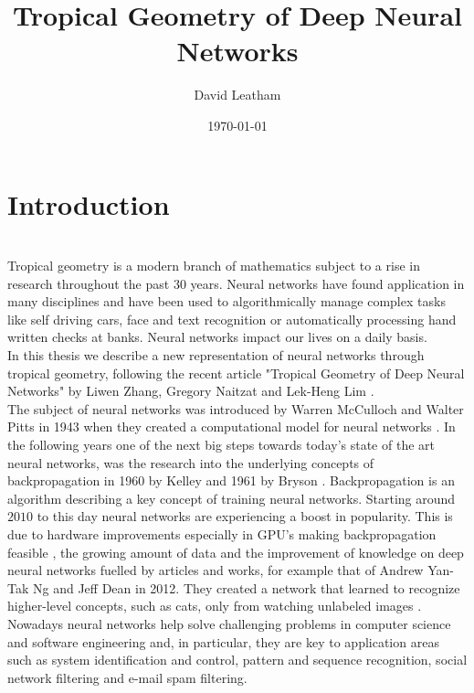 \documentclass{article}
\title{Tropical Geometry of Deep Neural Networks}
\author{David Leatham}
\date{\today}
\theoremstyle{definition}
\begin{document}


\newpage
  
\tableofcontents

\newpage


\section{Introduction} 
\leavevmode
\\
Tropical geometry is a modern branch of mathematics subject to a rise in research throughout the past 30 years. Neural networks have found application in many disciplines and have been used to algorithmically manage complex tasks like self driving cars, face and text recognition or automatically processing hand written checks at banks. Neural networks impact our lives on a daily basis. \\
In this thesis we describe a new representation of neural networks through tropical geometry, following the recent article "Tropical Geometry of Deep Neural Networks" by Liwen Zhang, Gregory Naitzat and Lek-Heng Lim \cite{maclagan2015introduction}. \\

The subject of neural networks was introduced by Warren McCulloch and Walter Pitts in 1943 when they created a computational model for neural networks \cite{mcculloch1943logical}. In the following years one of the next big steps towards today's state of the art neural networks, was the research into the underlying concepts of backpropagation in 1960 by Kelley \cite{kelley1960gradient} and 1961 by Bryson \cite{bryson1961gradient}. Backpropagation is an algorithm describing a key concept of training neural networks. Starting around $2010$ to this day neural networks are experiencing a boost in popularity. This is due to hardware improvements especially in GPU's making backpropagation feasible \cite{cirecsan2010deep}, the growing amount of data and the improvement of knowledge on deep neural networks fuelled by articles and works, for example that of Andrew Yan-Tak Ng and Jeff Dean in 2012. They created a network that learned to recognize higher-level concepts, such as cats, only from watching unlabeled images \cite{DBLP:journals/corr/abs-1112-6209}. Nowadays neural networks help solve challenging problems in computer science and software engineering and, in particular, they are key to application areas such as system identification and control, pattern and sequence recognition, social network filtering and e-mail spam filtering. \\
\end{document}

